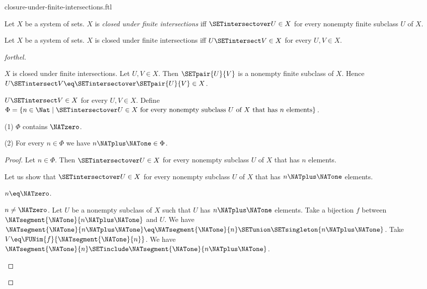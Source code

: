\documentclass{naproche-library}
\begin{document}
\begin{smodule}[title=Closure Under Finite Intersections]{closure-under-finite-intersections.ftl}

\begin{definition}[forthel,id=FOUNDATIONS_14_4297814324543488]
  Let $X$ be a system of sets.
  $X$ is \emph{closed under finite intersections} iff $\SETintersectover U \in X$ for every nonempty finite subclass $U$ of $X$.
\end{definition}

\begin{proposition}[forthel,id=FOUNDATIONS_17_1405012582334464]
  Let $X$ be a system of sets.
  $X$ is closed under finite intersections iff $U \SETintersect V \in X$ for every $U, V \in X$.
\end{proposition}
\begin{proof}[forthel]
  \begin{case}{$X$ is closed under finite intersections.}
    Let $U, V \in X$.
    Then $\SETpair{U}{V}$ is a nonempty finite subclass of $X$.
    Hence $U \SETintersect V \eq \SETintersectover \SETpair{U}{V} \in X$.
  \end{case}

  \begin{case}{$U \SETintersect V \in X$ for every $U, V \in X$.}
    Define $\Phi = \{ n \in \Nat \mid \SETintersectover U \in X\text{ for every nonempty subclass }U\text{ of }X\text{ that has }n\text{ elements}\}$.

    (1) $\Phi$ contains $\NATzero$.

    (2) For every $n \in \Phi$ we have $n \NATplus \NATone \in \Phi$.
    \begin{proof}
      Let $n \in \Phi$.
      Then $\SETintersectover U \in X$ for every nonempty subclass $U$ of $X$ that has $n$ elements.

      Let us show that $\SETintersectover U \in X$ for every nonempty subclass $U$ of $X$ that has $n \NATplus \NATone$ elements.

        \begin{case}{$n \eq \NATzero$.} \end{case}

        \begin{case}{$n \neq \NATzero$.}
          Let $U$ be a nonempty subclass of $X$ such that $U$ has $n \NATplus \NATone$ elements.
          Take a bijection $f$ between $\NATsegment{\NATone}{n \NATplus \NATone}$ and $U$.
          We have $\NATsegment{\NATone}{n \NATplus \NATone} \eq \NATsegment{\NATone}{n} \SETunion \SETsingleton{n \NATplus \NATone}$.
          Take $V \eq \FUNim{f}{\NATsegment{\NATone}{n}}$.
          We have $\NATsegment{\NATone}{n} \SETinclude \NATsegment{\NATone}{n \NATplus \NATone}$.


\end{case}
\end{proof}
\end{case}
\end{proof}
\end{smodule}
\end{document}
